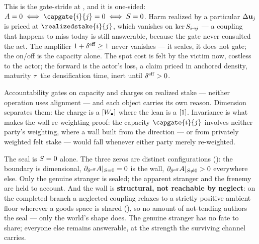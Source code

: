 \documentclass[../main]{subfiles}
\begin{document}
This is the gate-stride  at , and it is one-sided:
$\accountability=0\iff\capgate{i}{j}=0\iff\comovfield=0$. Harm realized by a particular
$\Delta\mathbf{u}\sb{j}$ is priced at $\realizedstake{i}{j}$, which vanishes on
$\ker S\sb{ i\!\to\!j }$ --- a coupling that happens to miss today is still answerable, because
the gate never consulted the act. The amplifier
$1+\effdensity\ge1$ never vanishes --- it scales, it does not gate; the on/off is the capacity
alone. The spot cost is felt by the victim now, costless to the actor; the forward is the
actor's loss, a claim priced in anchored density, maturity $\tau$ the densification time,
inert until $\effdensity>0$.

Accountability gates on capacity and charges on realized stake --- neither operation uses
alignment --- and each object carries its own reason.
Dimension separates them: the charge is a $[W\sb{\bullet}]$ where the lean is a $[1]$.
Invariance is what makes the wall re-weighting-proof: the capacity $\capgate{i}{j}$
involves neither party's weighting, where a wall built from the direction --- or from
privately weighted felt stake --- would fall whenever either party merely re-weighted.

\begin{corollary}
  The seal is $S=0$ alone. The three zeros are distinct configurations
  (): the boundary is dimensional,
  $\partial_{\effdensity}\accountability|_{\comovfield=0}=0$ is the wall,
  $\partial_{\effdensity}\accountability|_{\comovfield\neq0}>0$ everywhere else. Only the genuine stranger is
  sealed; the apparent stranger and the frenemy are held to account. And the wall is
  \textbf{structural, not reachable by neglect}: on the completed branch a neglected
  coupling relaxes to a strictly positive ambient floor wherever a goods space is
  shared (), so no amount of not-tending authors the seal ---
  only the world's shape does. The genuine stranger has no fate to share; everyone
  else remains answerable, at the strength the surviving channel carries.
\end{corollary}
\end{document}
